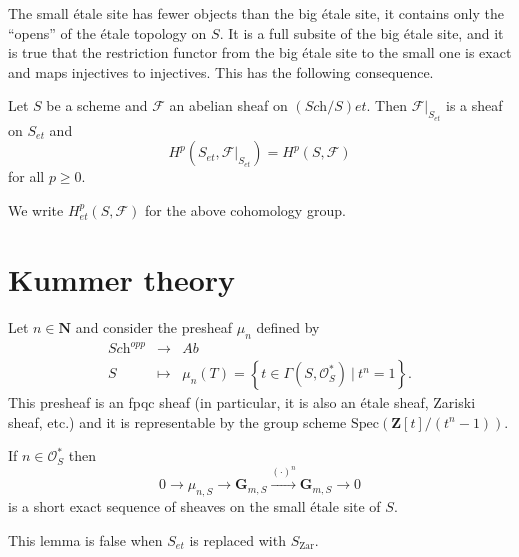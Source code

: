 \noindent
The small \'etale site has fewer objects than the big \'etale site, it contains
only the ``opens'' of the \'etale topology on $S$. It is a full subsite of the
big \'etale site, and it is true that the restriction functor from the big
\'etale site to the small one is exact and maps injectives to injectives. This
has the following consequence.

\begin{proposition}
\label{proposition-cohomology-restrict-small-site}
Let $S$ be a scheme and $\mathcal{F}$ an abelian sheaf on $(\textit{Sch}/S)et$.
Then $\mathcal{F}|_{S_{et}}$ is a sheaf on $S_{et}$ and
$$
H^p(S_{et}, \mathcal{F}|_{S_{et}}) = H^p(S, \mathcal{F})
$$
for all $p \geq 0$.
\end{proposition}

\noindent
We write $H_{et}^p(S,\mathcal{F})$ for the above cohomology group.





\section{Kummer theory}
\label{section-kummer}

\noindent
Let $n \in \mathbf{N}$ and consider the presheaf $\mu_n$ defined by
$$
\begin{matrix}
\textit{Sch}^{opp} & \longrightarrow & \textit{Ab} \\
S & \longmapsto & \mu_n(T) = \left\{t \in \Gamma(S, \mathcal{O}_S^*) \ | \
t^n = 1 \right\}.
\end{matrix}
$$
This presheaf is an fpqc sheaf (in particular, it is also an \'etale sheaf,
Zariski sheaf, etc.) and it is representable by the group scheme $\text{Spec}
(\mathbf{Z}[t]/(t^n-1))$.

\begin{lemma}
\label{lemma-kummer-sequence}
If $n\in \mathcal{O}_S^*$ then
$$
0\to \mu_{n, S} \to \mathbf{G}_{m, S} \xrightarrow{(\cdot)^n} \mathbf{G}_{m,
S}\to 0
$$
is a short exact sequence of sheaves on the small \'etale site of $S$.
\end{lemma}

\begin{remark}
\label{remark-no-kummer-sequence-zariski}
This lemma is false when $S_{et}$ is replaced with $S_\mathrm{Zar}$.
\end{remark}

